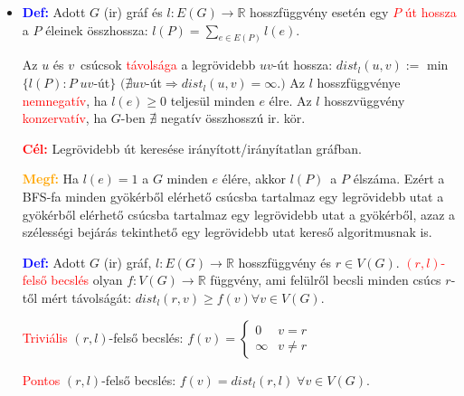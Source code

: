 \documentclass[../../szobeli.tex]{subfiles}
\begin{document}
\begin{center}
    \noindent{}
\end{center}

    \begin{itemize}
        \item \textbf{\textcolor{blue}{Def:}} Adott $G$ (ir) gráf és $l : E(G) \rightarrow \mathbb{R}$ hosszfüggvény esetén egy \textcolor{red}{$P$ út hossza} a $P$ éleinek összhossza: $l(P) = \sum_{e\in E(P)} l(e)$.

        Az $u$ és $v$ csúcsok \textcolor{red}{távolsága} a legrövidebb $uv$-út hossza: $dist_l(u,v):=$ min$\{l(P):P \;uv$-út$\}$ $(\nexists uv$-út$\Rightarrow dist_l (u,v)= \infty.)$ Az $l$  hosszfüggvénye \textcolor{red}{nemnegatív}, ha $l(e) \geq 0$ teljesül minden $e$ élre. Az $l$ hosszvüggvény \textcolor{red}{konzervatív}, ha $G$-ben $\nexists$ negatív összhosszú ir. kör.

        \textbf{\textcolor{red}{Cél:}} Legrövidebb út keresése irányított/irányítatlan gráfban.

        \textbf{\textcolor{orange}{Megf:}} Ha $l(e) = 1 $ a $G$ minden $e$ élére, akkor $l(P)$ a $P$ élszáma. Ezért a BFS-fa minden gyökérből elérhető csúcsba tartalmaz egy legrövidebb utat a gyökérből elérhető csúcsba tartalmaz egy legrövidebb utat a gyökérből, azaz a szélességi bejárás tekinthető egy legrövidebb utat kereső algoritmusnak is. 

        \textbf{\textcolor{blue}{Def:}} Adott $G$ (ir) gráf, $l : E(G) \rightarrow \mathbb{R}$ hosszfüggvény és $r \in V(G)$. \textcolor{red}{$(r,l)$-felső becslés} olyan $f: V(G) \rightarrow \mathbb{R}$ függvény, ami felülről becsli minden csúcs $r$-től mért távolságát: $dist_l (r,v) \geq f(v) \forall v \in V(G)$.

        \textcolor{red}{Triviális} $(r,l)$-felső becslés:
        $
            f(v) = \begin{cases}
                0 & v = r \\
                \infty & v \neq r
            \end{cases}
        $

        \textcolor{red}{Pontos} $(r,l)$-felső becslés: $f(v) = dist_l(r,l)\; \forall v \in V(G)$.\
        

\end{itemize}
\end{document}

